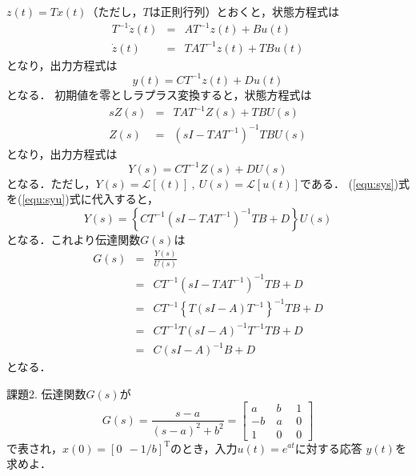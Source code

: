\documentclass[a4paper,12pt]{jarticle}
\begin{document}
\section*{}
$z(t)=Tx(t)$（ただし，$T$は正則行列）とおくと，状態方程式は
%
\begin{eqnarray}
 T^{-1}\dot{z}(t)&=&AT^{-1} z(t)+Bu(t) \nonumber\\
  \dot{z}(t)&=&TAT^{-1}z(t)+TBu(t)
\end{eqnarray}
%
となり，出力方程式は
%
\begin{equation}
 y(t)=CT^{-1}z(t)+Du(t)
\end{equation}
%
となる．
%
初期値を零としラプラス変換すると，状態方程式は
\begin{eqnarray}\label{equ:sys}
 sZ(s)&=&TAT^{-1}Z(s)+TBU(s) \nonumber\\
 Z(s)&=&(sI-TAT^{-1})^{-1}TBU(s)
\end{eqnarray}
となり，出力方程式は
\begin{equation}\label{equ:syu}
 Y(s)=CT^{-1}Z(s)+DU(s)
\end{equation}
となる．ただし，$Y(s)=\mathcal{L}[(t)]~,~U(s)=\mathcal{L}[u(t)]$である．
(\ref{equ:sys})式を(\ref{equ:syu})式に代入すると，
%
\begin{equation}
 Y(s)=\left\{CT^{-1}(sI-TAT^{-1})^{-1}TB+D\right\}U(s)
\end{equation}
%
となる．これより伝達関数$G(s)$は
%
\begin{eqnarray}
 G(s)&=&\frac{Y(s)}{U(s)} \nonumber\\
 &=&CT^{-1}(sI-TAT^{-1})^{-1}TB+D \nonumber\\
 &=&CT^{-1}\left\{T(sI-A)T^{-1}\right\}^{-1}TB+D \nonumber\\
 &=&CT^{-1}T(sI-A)^{-1}T^{-1}TB+D \nonumber\\
 &=&C(sI-A)^{-1}B+D
\end{eqnarray}
%
となる．
\begin{itembox}[l]{\Large{課題2.}}
伝達関数$G(s)$が
\begin{equation}
 G(s)=\frac{s-a}{(s-a)^2+b^2}
  =\left[
  \begin{array}{rc|r}
  a   &~ b ~&~ 1 \\
   -b &~ a ~&~ 0 \\ \hline
   1  &~ 0 ~&~ 0
  \end{array}
  \right]
\end{equation}
で表され，$x(0)=[0~~-1/b]^{\mathrm{T}}$のとき，入力$u(t)=e^{at}$に対する応答
$y(t)$を求めよ．
\end{itembox}
\end{document}
